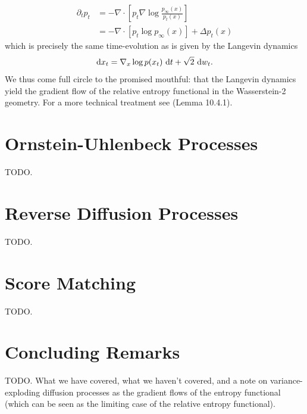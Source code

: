 \documentclass{scrartcl}
\begin{document}
\begin{align*}
\partial_t p_t &= - \nabla \cdot \left[p_t \nabla \log \frac{p_\infty(x)}{p_t(x)}\right]\\
&= -\nabla \cdot \left[p_t \log p_\infty(x)\right] + \Delta p_t(x)
\end{align*}
which is precisely the same time-evolution as is given by the Langevin dynamics
\begin{equation}
    \d x_t = \nabla_x \log p(x_t)\, \d t + \sqrt{2}\, \d w_t.
\end{equation}
We thus come full circle to the promised mouthful: that the Langevin dynamics yield the gradient flow of the relative entropy functional in the Wasserstein-2 geometry. For a more technical treatment see \citep{ambrosio2005gradient} (Lemma 10.4.1).

\section{Ornstein-Uhlenbeck Processes}
\label{sec:ou}
TODO.
\section{Reverse Diffusion Processes}
\label{sec:reverse_diffusion}
TODO.
\section{Score Matching}
\label{sec:score_matching}
TODO.
\section{Concluding Remarks}
TODO.
\label{sec:remarks}
What we have covered, what we haven't covered, and a note on variance-exploding diffusion processes as the gradient flows of the entropy functional (which can be seen as the limiting case of the relative entropy functional).

\end{document}
